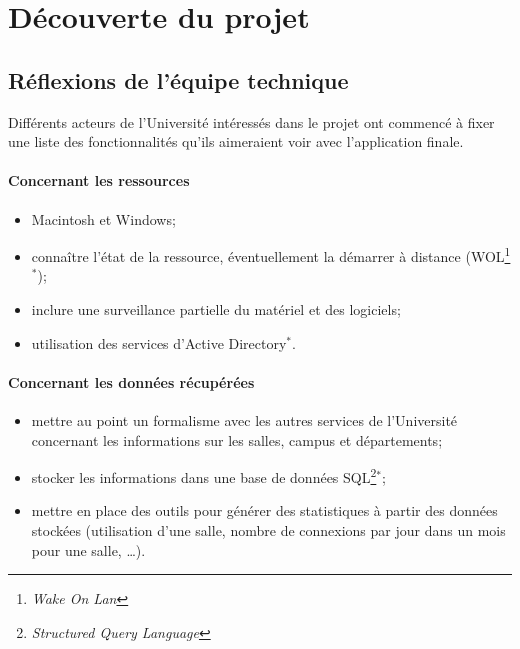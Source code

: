 \chapter{D\'ecouverte du projet}

\section{R\'eflexions de l'\'equipe technique}

Diff\'erents acteurs de l'Universit\'e int\'eress\'es dans le projet \YuukouII{} ont commenc\'e \`a fixer une liste des fonctionnalit\'es qu'ils aimeraient voir avec l'application finale.

\subsubsection{Concernant les ressources}

\begin{itemize}
	\item Macintosh et Windows;
	\item conna\^itre l'\'etat de la ressource, \'eventuellement la d\'emarrer \`a distance (WOL\protect\footnote{\textit{Wake On Lan}}$^*$);
	\item inclure une surveillance partielle du mat\'eriel et des logiciels;
	\item utilisation des services d'Active Directory$^*$.

\end{itemize}

\subsubsection{Concernant les donn\'ees r\'ecup\'er\'ees}

\begin{itemize}
	\item mettre au point un formalisme avec les autres services de l'Universit\'e concernant les informations sur les salles, campus et d\'epartements;
	\item stocker les informations dans une base de donn\'ees SQL\protect\footnote{\textit{Structured Query Language}}$^*$;
	\item mettre en place des outils pour g\'en\'erer des statistiques \`a partir des donn\'ees stock\'ees (utilisation d'une salle, nombre de connexions par jour dans un mois pour une salle, \ldots).

\end{itemize}

